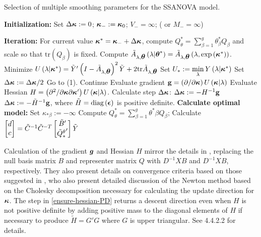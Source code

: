 \begin{algorithm}[H]
\caption{Selection of multiple smoothing parameters for the SSANOVA model.}\label{alg:SSANOVA-algorithm}
\begin{algorithmic}
\STATE \textbf{Initialization:} 
	\STATE Set $\Delta \mbox{\boldmath $\kappa$} := 0$; \;$\mbox{\boldmath $\kappa$}_{-}:=\mbox{\boldmath $\kappa$}_{0}$; \;$V_- = \infty$; \;( or $M_- = \infty$)

\STATE \textbf{Iteration:} 
		\STATE For current value $\mbox{\boldmath $\kappa$}^* = \mbox{\boldmath $\kappa$}_- + \Delta \mbox{\boldmath $\kappa$}$, compute $Q^*_\theta = \sum_{\beta = 1}^g \theta^*_\beta Q_\beta$ and scale so that $\mbox{tr}\left(Q_\beta\right)$ is fixed. 
		\STATE Compute $\tilde{A}_{\lambda,\mbox{\boldmath $\theta$}}\left(\lambda \vert \mbox{\boldmath $\theta$}^* \right) = \tilde{A}_{\lambda,\mbox{\boldmath $\theta$}}\left(\lambda, \exp\left({\mbox{\boldmath $\kappa$}^*} \right)\right)$.
		\STATE Minimize $U\left(\lambda \vert \mbox{\boldmath $\kappa$}^* \right) =  \tilde{Y}'\left( I - \tilde{A}_{\lambda,\mbox{\boldmath $\theta$}} \right)^2\tilde{Y} + 2\mbox{tr}\tilde{A}_{\lambda,\mbox{\boldmath $\theta$}} $
		\STATE Set $U_* := \min \limits_\lambda Y\left( \lambda \vert \mbox{\boldmath $\kappa$}^* \right) $
		 		\STATE Set $\Delta \mbox{\boldmath $\kappa$} := \Delta \mbox{\boldmath $\kappa$}/2$
		 		\STATE Go to (1).
		\ELSE
		\STATE Continue
		\ENDIF
		\STATE Evaluate gradient $\mathbf{g} = \left(\partial /\partial \mbox{\boldmath $\kappa$}\right) U\left(\mbox{\boldmath $\kappa$} \vert \lambda\right)$
		\STATE Evaluate Hessian $H = \left(\partial^2 /\partial \mbox{\boldmath $\kappa$}\partial \mbox{\boldmath $\kappa$}' \right) U\left(\mbox{\boldmath $\kappa$} \vert \lambda\right)$.
		\STATE Calculate step $\Delta \mbox{\boldmath $\kappa$}$:
				\STATE $\Delta \mbox{\boldmath $\kappa$} := -H^{-1} \mathbf{g}$
			\ELSE
				\STATE $\Delta \mbox{\boldmath $\kappa$} := -\tilde{H}^{-1} \mathbf{g}$, where $\tilde{H} = \textup{diag}\left(\mbox{\boldmath $\epsilon$}\right)$ is positive definite. \label{ensure-hessian-PD}
			\ENDIF
	\ENDWHILE
\STATE \textbf{Calculate optimal model:} 
		\STATE Set $\kappa_{*\beta} := -\infty$
	\ENDIF
	\STATE Compute $Q^*_\theta = \sum_{\beta = 1}^g \theta^*{\beta} Q_\beta$;
	\STATE Calculate $\begin{bmatrix} d \\ c \end{bmatrix} = \tilde{C}^{-1} \tilde{C}^{-T} \begin{bmatrix} \tilde{B}' \\ {\tilde{Q}_*^\theta}' \end{bmatrix} \tilde{Y}$
\end{algorithmic}
\end{algorithm}

Calculation of the gradient $\mbox{\boldmath $g$}$ and Hessian $H$ mirror the details in \cite{gu1991minimizing}, replacing the null basis matrix $B$ and representer matrix $Q$ with $D^{-1}XB$ and $D^{-1}XB$, respectively. They also present details on convergence criteria based on those suggested in \cite{gill1981practical}, who also present detailed discussion of the Newton method based on the Cholesky decomposition necessary for calculating the update direction for $\mbox{\boldmath $\kappa$}$. The step in \ref{ensure-hessian-PD} returns a descent direction even when $H$ is not positive definite by adding positive mass to the diagonal elements of $H$ if necessary to produce $\tilde{H} = G'G$ where $G$ is upper triangular. See \cite{gill1981practical} 4.4.2.2 for details. 

